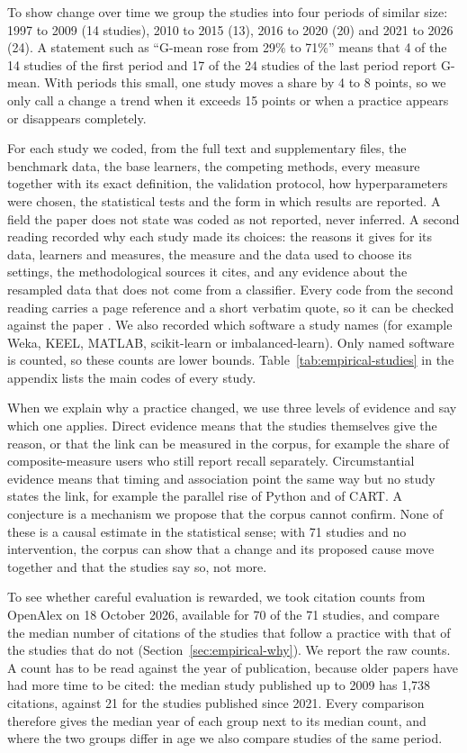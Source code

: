 To show change over time we group the studies into four periods of similar size: 1997 to 2009 (14 studies), 2010 to 2015 (13), 2016 to 2020 (20) and 2021 to 2026 (24). A statement such as ``G-mean rose from 29\% to 71\%'' means that 4 of the 14 studies of the first period and 17 of the 24 studies of the last period report G-mean. With periods this small, one study moves a share by 4 to 8 points, so we only call a change a trend when it exceeds 15 points or when a practice appears or disappears completely.

For each study we coded, from the full text and supplementary files, the benchmark data, the base learners, the competing methods, every measure together with its exact definition, the validation protocol, how hyperparameters were chosen, the statistical tests and the form in which results are reported. A field the paper does not state was coded as not reported, never inferred. A second reading recorded why each study made its choices: the reasons it gives for its data, learners and measures, the measure and the data used to choose its settings, the methodological sources it cites, and any evidence about the resampled data that does not come from a classifier. Every code from the second reading carries a page reference and a short verbatim quote, so it can be checked against the paper . We also recorded which software a study names (for example Weka, KEEL, MATLAB, scikit-learn or imbalanced-learn). Only named software is counted, so these counts are lower bounds. Table~\ref{tab:empirical-studies} in the appendix lists the main codes of every study.

When we explain why a practice changed, we use three levels of evidence and say which one applies. Direct evidence means that the studies themselves give the reason, or that the link can be measured in the corpus, for example the share of composite-measure users who still report recall separately. Circumstantial evidence means that timing and association point the same way but no study states the link, for example the parallel rise of Python and of CART. A conjecture is a mechanism we propose that the corpus cannot confirm. None of these is a causal estimate in the statistical sense; with 71 studies and no intervention, the corpus can show that a change and its proposed cause move together and that the studies say so, not more.

To see whether careful evaluation is rewarded, we took citation counts from OpenAlex on 18 October 2026, available for 70 of the 71 studies, and compare the median number of citations of the studies that follow a practice with that of the studies that do not (Section~\ref{sec:empirical-why}). We report the raw counts. A count has to be read against the year of publication, because older papers have had more time to be cited: the median study published up to 2009 has 1,738 citations, against 21 for the studies published since 2021. Every comparison therefore gives the median year of each group next to its median count, and where the two groups differ in age we also compare studies of the same period.

